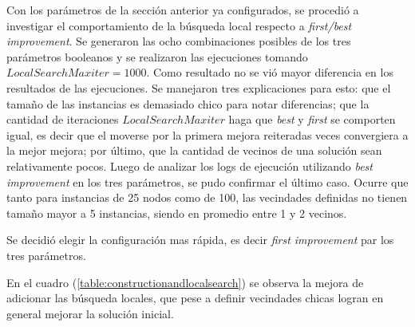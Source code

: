 \documentclass{article}
\begin{document}
  Con los parámetros de la sección anterior ya configurados, se procedió a investigar el comportamiento de la búsqueda local respecto a {\it first/best improvement}. Se generaron las ocho combinaciones posibles de los tres parámetros booleanos y se realizaron las ejecuciones tomando $LocalSearchMaxiter = 1000$. Como resultado no se vió mayor diferencia en los resultados de las ejecuciones. Se manejaron tres explicaciones para esto: que el tamaño de las instancias es demasiado chico para notar diferencias; que la cantidad de iteraciones $LocalSearchMaxiter$ haga que {\it best} y {\it first} se comporten igual, es decir que el moverse por la primera mejora reiteradas veces convergiera a la mejor mejora; por último, que la cantidad de vecinos de una solución sean relativamente pocos. Luego de analizar los logs de ejecución utilizando {\it best improvement} en los tres parámetros, se pudo confirmar el último caso. Ocurre que tanto para instancias de 25 nodos como de 100, las vecindades definidas no tienen tamaño mayor a 5 instancias, siendo en promedio entre 1 y 2 vecinos.
  
  Se decidió elegir la configuración mas rápida, es decir {\it first improvement} par los tres parámetros.

  En el cuadro (\ref{table:constructionandlocalsearch}) se observa la mejora de adicionar las búsqueda locales, que pese a definir vecindades chicas logran en general mejorar la solución inicial.
\end{document}
